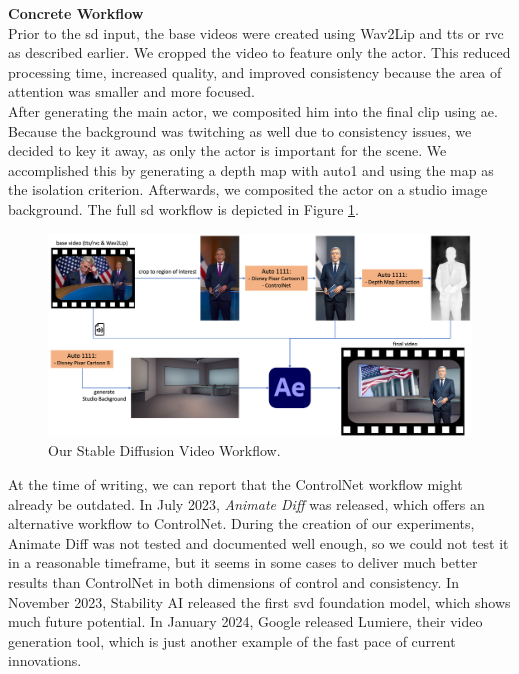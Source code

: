 \documentclass[
  a4paper,  %
  twoside,  %
  bibliography=totoc,
  headsepline,
  cleardoublepage=empty,
  parskip=half,
  draft=false
]{scrbook}
\begin{document}
\textbf{Concrete Workflow} \\
Prior to the \gls{sd} input, the base videos were created using Wav2Lip and \gls{tts} or \gls{rvc} as described earlier. We cropped the video to feature only the actor. This reduced processing time, increased quality, and improved consistency because the area of attention was smaller and more focused. \\
After generating the main actor, we composited him into the final clip using \gls{ae}. Because the background was  twitching as well due to consistency issues, we decided to key it away, as only the actor is important for the scene. We accomplished this by generating a depth map with \gls{auto1} and using the map as the isolation criterion. Afterwards, we composited the actor on a studio image background. The full \gls{sd} workflow is depicted in Figure \ref{fig:sd-full-workflow}.

\begin{figure}[h]
  \centering
  \includegraphics[width=1\textwidth]{./graphics/diffusion/sd-workflow.png}
  \caption{Our Stable Diffusion Video Workflow.}
  \label{fig:sd-full-workflow}
\end{figure}

At the time of writing, we can report that the ControlNet workflow might already be outdated. In July 2023, \textit{Animate Diff} was released, which offers an alternative workflow to ControlNet. During the creation of our experiments, Animate Diff was not tested and documented well enough, so we could not test it in a reasonable timeframe, but it seems in some cases to deliver much better results than ControlNet in both dimensions of control and consistency. In November 2023, Stability AI released the first \gls{svd} foundation model, which shows much future potential. In January 2024, Google released Lumiere, their video generation tool, which is just another example of the fast pace of current innovations.
\end{document}

